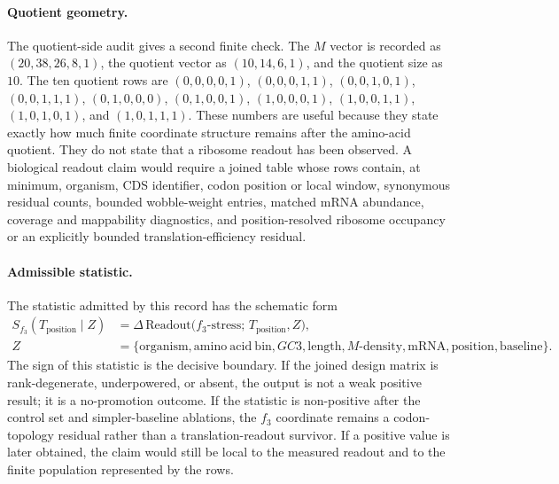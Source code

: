 \paragraph{Quotient geometry.}
The quotient-side audit gives a second finite check.  The $M$ vector is recorded as $(20,38,26,8,1)$, the quotient vector as $(10,14,6,1)$, and the quotient size as $10$.  The ten quotient rows are
$(0,0,0,0,1)$, $(0,0,0,1,1)$, $(0,0,1,0,1)$, $(0,0,1,1,1)$, $(0,1,0,0,0)$, $(0,1,0,0,1)$, $(1,0,0,0,1)$, $(1,0,0,1,1)$, $(1,0,1,0,1)$, and $(1,0,1,1,1)$.
These numbers are useful because they state exactly how much finite coordinate structure remains after the amino-acid quotient.  They do not state that a ribosome readout has been observed.  A biological readout claim would require a joined table whose rows contain, at minimum, organism, CDS identifier, codon position or local window, synonymous residual counts, bounded wobble-weight entries, matched mRNA abundance, coverage and mappability diagnostics, and position-resolved ribosome occupancy or an explicitly bounded translation-efficiency residual.

\paragraph{Admissible statistic.}
The statistic admitted by this record has the schematic form
$$
\begin{aligned}
S_{f_3}(T_{\mathrm{position}}\mid Z)
  &= \Delta\,\mathrm{Readout}\bigl(f_3\text{-stress};\,T_{\mathrm{position}},Z\bigr),\\
Z
  &= \{\mathrm{organism},\mathrm{amino\ acid\ bin},GC3,\mathrm{length},M\text{-density},\mathrm{mRNA},\mathrm{position},\mathrm{baseline}\}.
\end{aligned}
$$
The sign of this statistic is the decisive boundary.  If the joined design matrix is rank-degenerate, underpowered, or absent, the output is not a weak positive result; it is a no-promotion outcome.  If the statistic is non-positive after the control set and simpler-baseline ablations, the $f_3$ coordinate remains a codon-topology residual rather than a translation-readout survivor.  If a positive value is later obtained, the claim would still be local to the measured readout and to the finite population represented by the rows.

